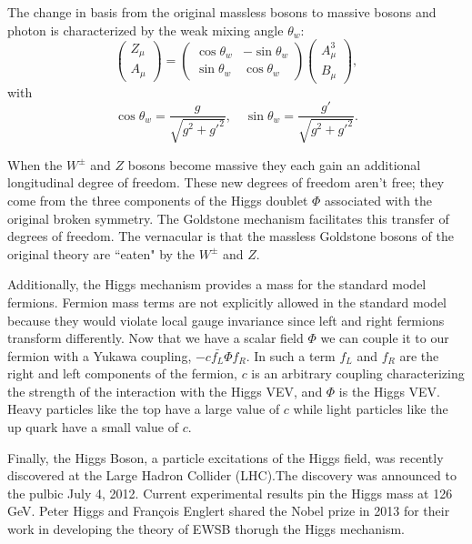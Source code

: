 The change in basis from the original massless bosons to massive bosons and photon is characterized by the weak mixing angle $\theta_w$:
\begin{equation}
  \left(\begin{matrix}Z_\mu\\A_\mu\end{matrix}\right)=\left(\begin{matrix}\cos\theta_w & -\sin\theta_w\\\sin\theta_w & \cos\theta_w\end{matrix}\right)\left(\begin{matrix}A^3_\mu\\ B_\mu\end{matrix}\right),
\end{equation}
with
\begin{equation}
  \cos\theta_w=\frac{g}{\sqrt{g^2+g'^2}},\quad\sin\theta_w=\frac{g'}{\sqrt{g^2+g'^2}}.
\end{equation}

When the $W^\pm$ and $Z$ bosons become massive they each gain an additional longitudinal degree of freedom.
These new degrees of freedom aren't free; they come from the three components of the Higgs doublet $\Phi$ associated with the original broken symmetry.
The Goldstone mechanism facilitates this transfer of degrees of freedom.
The vernacular is that the massless Goldstone bosons of the original theory are ``eaten" by the $W^\pm$ and $Z$.


Additionally, the Higgs mechanism provides a mass for the standard model fermions.
Fermion mass terms are not explicitly allowed in the standard model because they would violate local gauge invariance since left and right fermions transform differently.
Now that we have a scalar field $\Phi$ we can couple it to our fermion with a Yukawa coupling, $-c\bar{f_L}\Phi f_R$.
In such a term $f_L$ and $f_R$ are the right and left components of the fermion, $c$ is an arbitrary coupling characterizing the strength of the interaction with the Higgs VEV, and $\Phi$ is the Higgs VEV.
Heavy particles like the top have a large value of $c$ while light particles like the up quark have a small value of $c$.

Finally, the Higgs Boson, a particle excitations of the Higgs field, was recently discovered at the Large Hadron Collider (LHC).The discovery was announced to the pulbic July 4, 2012.
Current experimental results pin the Higgs mass at 126 GeV.
Peter Higgs and François Englert shared the Nobel prize in 2013 for their work in developing the theory of EWSB thorugh the Higgs mechanism.
